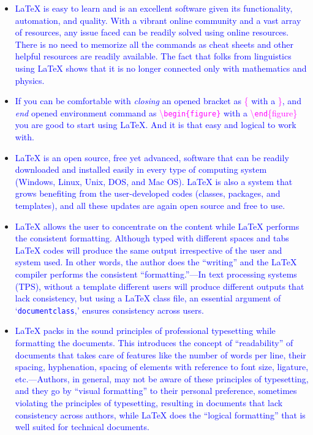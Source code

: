 \documentclass[phd]{ndsu-thesis-2022}
\newcommand\italk[1]{\textcolor{blue}{#1}}  %
\newcommand\cmd[1]{\textbackslash\texttt{#1}}  %
\newcommand\lx{\LaTeX\xspace}
\newcommand\vb[1]{\textcolor{blue}{\texttt{#1}}}%
\begin{document}
\begin{itemize}[leftmargin=*, itemsep=0pt, parsep=3pt] 

\item \italk{\lx is easy to learn and is an excellent software given its functionality, automation, and quality. With a vibrant online community and a vast array of resources, any issue faced can be readily solved using online resources. There is no need to memorize all the commands as cheat sheets and other helpful resources are readily available. The fact that folks from linguistics using \lx shows that it is no longer connected only with mathematics and physics.} 

\item \italk{ If you can be comfortable with \emph{closing} an opened bracket as \textcolor{magenta}{\{} with a \textcolor{magenta}{\}}, and \emph{end} opened environment command as \textcolor{magenta}{\cmd{begin\{figure\}}} with a  \textcolor{magenta}{\cmd{end}\{figure\}} you are good to start using \lx. And it is that easy and logical to work with.}

\item \italk{\lx is an open source, free yet advanced, software that can be readily downloaded and installed easily in every type of computing system (Windows, Linux, Unix, DOS, and Mac OS). \lx is also a system that grows benefiting from the user-developed codes (classes, packages, and templates), and all these updates are again open source and free to use.}  

\item \italk{\lx allows the user to concentrate on the content while \lx performs the consistent formatting. Although typed with different spaces and tabs \lx codes will produce the same output irrespective of the user and system used. In other words, the author does the ``writing'' and the \lx compiler performs the consistent ``formatting.''---In text processing systems (TPS), without a template different users will produce different outputs that lack consistency, but using a \lx class file, an essential argument of `\vb{documentclass},' ensures consistency across users.}  

\item \italk{\lx packs in the sound principles of professional typesetting while formatting the documents. This introduces the concept of ``readability'' of documents that takes care of features like the number of words per line, their spacing, hyphenation, spacing of elements with reference to font size, ligature, etc.---Authors, in general, may not be aware of these principles of typesetting, and they go by ``visual formatting'' to their personal preference, sometimes violating the principles of typesetting, resulting in documents that lack consistency across authors, while \lx does the ``logical formatting'' that is well suited for technical documents.} 


\end{itemize}
\end{document}
